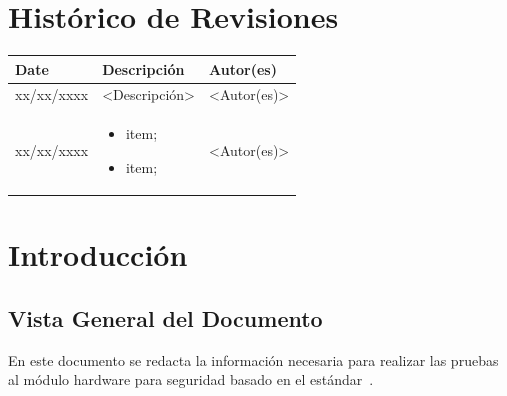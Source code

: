\documentclass[a4paper]{article}
\begin{document}

\capa
\newpage

\section*{\center Histórico de Revisiones}
  \vspace*{1cm}
  \begin{table}[ht]
    \centering
    \begin{tabular}[pos]{|m{2cm} | m{7.2cm} | m{3.8cm}|} 
      \hline
      \cellcolor[gray]{0.9}
      \textbf{Date} & \cellcolor[gray]{0.9}\textbf{Descripción} & \cellcolor[gray]{0.9}\textbf{Autor(es)}\\ \hline
      \hline
      \small xx/xx/xxxx & \small <Descripción> & \small <Autor(es)> \\ \hline      
      \small xx/xx/xxxx &
      \begin{small}
        \begin{itemize}
          \item item;
          \item item;
        \end{itemize}
      \end{small} & \small <Autor(es)> \\ \hline 
    \end{tabular}
  \end{table}

\newpage

\tableofcontents
\newpage

\section{Introducción}

\subsection{Vista General del Documento}
En este documento se redacta la información necesaria para realizar las pruebas al módulo hardware para seguridad basado en el estándar~\cite{1059-1993-std:1994}.
\end{document}
